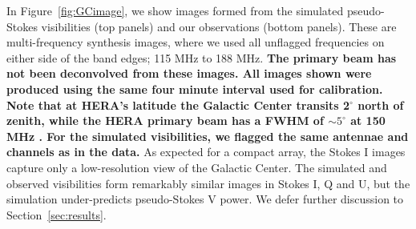 \documentclass[twocolumn, trackchanges]{aastex61}
\newcommand{\edited}[1]{{\bf \color{red} #1}}
\begin{document}
In Figure~\ref{fig:GCimage}, we show images formed from the simulated pseudo-Stokes visibilities (top panels) and our observations (bottom panels). These are multi-frequency synthesis images, where we used all unflagged frequencies on either side of the band edges; 115 MHz to 188 MHz. \edited{The primary beam has not been deconvolved from these images. All images shown were produced using the same four minute interval used for calibration. Note that at HERA's latitude the Galactic Center transits 2$^{\circ}$ north of zenith, while the HERA primary beam has a FWHM of $\sim5^{\circ}$ at 150\,MHz \citep{Neben.16}. For the simulated visibilities, we flagged the same antennae and channels as in the data.}  As expected for a compact array, the Stokes I images capture only a low-resolution view of the Galactic Center. The simulated and observed visibilities form remarkably similar images in Stokes I, Q and U, but the simulation under-predicts pseudo-Stokes V power. We defer further discussion to Section~\ref{sec:results}.
\end{document}
